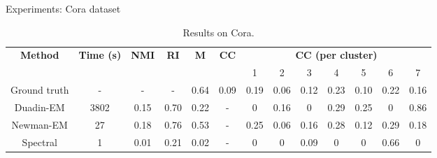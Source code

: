 \documentclass[final]{beamer}
\newlength{\colwidth}
\begin{document}
\begin{frame}[t]
\begin{columns}[t]
\begin{column}{\colwidth}
\begin{block}{Experiments: Cora dataset}
        \begin{table}[H]
          \centering
          \small
          \setlength\heavyrulewidth{0.25ex}
          \begin{tabular}{@{}ccccccccccccc@{}}
            \toprule
            \multirow{2}{*}{\textbf{Method}}  & \multirow{2}{*}{\textbf{Time (s)}} & \multirow{2}{*}{\textbf{NMI}} & \multirow{2}{*}{\textbf{RI}} & \multirow{2}{*}{\textbf{M}} & \multirow{2}{*}{\textbf{CC}} & \multicolumn{7}{c}{\textbf{CC (per cluster)}}                                           \\
                                              &                                    &                               &                              &                             &                              & 1                                             & 2    & 3    & 4    & 5    & 6    & 7    \\ \midrule
            \multicolumn{1}{c|}{Ground truth} & \multicolumn{1}{c|}{-}             & -                             & \multicolumn{1}{c|}{-}       & 0.64                        & 0.09                         & 0.19                                          & 0.06 & 0.12 & 0.23 & 0.10 & 0.22 & 0.16 \\
            \multicolumn{1}{c|}{Duadin-EM}    & \multicolumn{1}{c|}{3802}          & 0.15                          & \multicolumn{1}{c|}{0.70}    & 0.22                        & -                            & 0                                             & 0.16 & 0    & 0.29 & 0.25 & 0    & 0.86 \\
            \multicolumn{1}{c|}{Newman-EM}    & \multicolumn{1}{c|}{27}            & 0.18                          & \multicolumn{1}{c|}{0.76}    & 0.53                        & -                            & 0.25                                          & 0.06 & 0.16 & 0.28 & 0.12 & 0.29 & 0.18 \\
            \multicolumn{1}{c|}{Spectral}     & \multicolumn{1}{c|}{1}             & 0.01                          & \multicolumn{1}{c|}{0.21}    & 0.02                        & -                            & 0                                             & 0    & 0.09 & 0    & 0    & 0.66 & 0    \\ \bottomrule
          \end{tabular}
          \caption{Results on Cora.}
        \end{table}

      \end{block}


\end{column}
\end{columns}
\end{frame}
\end{document}
